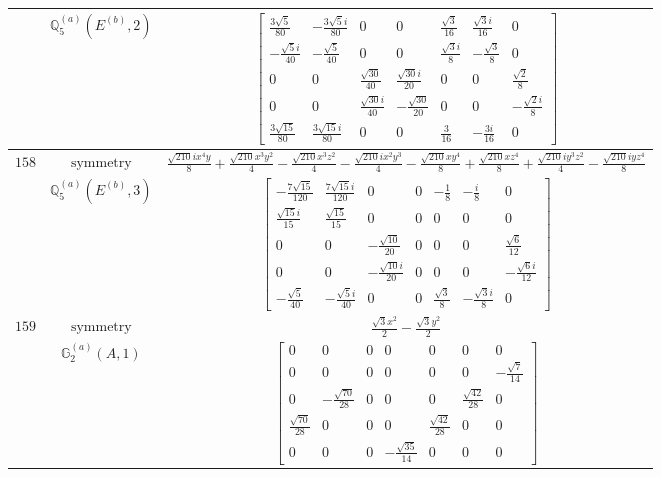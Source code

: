 \documentclass[fleqn,8pt,landscape]{jsarticle}
\begin{document}
\begin{longtable}{ccc}
$  $ & $ \mathbb{Q}_{5}^{(a)}(E^{(b)},2) $ & $ \begin{bmatrix} \frac{3 \sqrt{5}}{80} & - \frac{3 \sqrt{5} i}{80} & 0 & 0 & \frac{\sqrt{3}}{16} & \frac{\sqrt{3} i}{16} & 0 \\ - \frac{\sqrt{5} i}{40} & - \frac{\sqrt{5}}{40} & 0 & 0 & \frac{\sqrt{3} i}{8} & - \frac{\sqrt{3}}{8} & 0 \\ 0 & 0 & \frac{\sqrt{30}}{40} & \frac{\sqrt{30} i}{20} & 0 & 0 & \frac{\sqrt{2}}{8} \\ 0 & 0 & \frac{\sqrt{30} i}{40} & - \frac{\sqrt{30}}{20} & 0 & 0 & - \frac{\sqrt{2} i}{8} \\ \frac{3 \sqrt{15}}{80} & \frac{3 \sqrt{15} i}{80} & 0 & 0 & \frac{3}{16} & - \frac{3 i}{16} & 0 \end{bmatrix} $ \\ \hline
$ 158 $ & $ \text{symmetry} $ & $ \frac{\sqrt{210} i x^{4} y}{8} + \frac{\sqrt{210} x^{3} y^{2}}{4} - \frac{\sqrt{210} x^{3} z^{2}}{4} - \frac{\sqrt{210} i x^{2} y^{3}}{4} - \frac{\sqrt{210} x y^{4}}{8} + \frac{\sqrt{210} x z^{4}}{8} + \frac{\sqrt{210} i y^{3} z^{2}}{4} - \frac{\sqrt{210} i y z^{4}}{8} $ \\
$  $ & $ \mathbb{Q}_{5}^{(a)}(E^{(b)},3) $ & $ \begin{bmatrix} - \frac{7 \sqrt{15}}{120} & \frac{7 \sqrt{15} i}{120} & 0 & 0 & - \frac{1}{8} & - \frac{i}{8} & 0 \\ \frac{\sqrt{15} i}{15} & \frac{\sqrt{15}}{15} & 0 & 0 & 0 & 0 & 0 \\ 0 & 0 & - \frac{\sqrt{10}}{20} & 0 & 0 & 0 & \frac{\sqrt{6}}{12} \\ 0 & 0 & - \frac{\sqrt{10} i}{20} & 0 & 0 & 0 & - \frac{\sqrt{6} i}{12} \\ - \frac{\sqrt{5}}{40} & - \frac{\sqrt{5} i}{40} & 0 & 0 & \frac{\sqrt{3}}{8} & - \frac{\sqrt{3} i}{8} & 0 \end{bmatrix} $ \\ \hline
$ 159 $ & $ \text{symmetry} $ & $ \frac{\sqrt{3} x^{2}}{2} - \frac{\sqrt{3} y^{2}}{2} $ \\
$  $ & $ \mathbb{G}_{2}^{(a)}(A,1) $ & $ \begin{bmatrix} 0 & 0 & 0 & 0 & 0 & 0 & 0 \\ 0 & 0 & 0 & 0 & 0 & 0 & - \frac{\sqrt{7}}{14} \\ 0 & - \frac{\sqrt{70}}{28} & 0 & 0 & 0 & \frac{\sqrt{42}}{28} & 0 \\ \frac{\sqrt{70}}{28} & 0 & 0 & 0 & \frac{\sqrt{42}}{28} & 0 & 0 \\ 0 & 0 & 0 & - \frac{\sqrt{35}}{14} & 0 & 0 & 0 \end{bmatrix} $ \\ \hline

\end{longtable}
\end{document}
